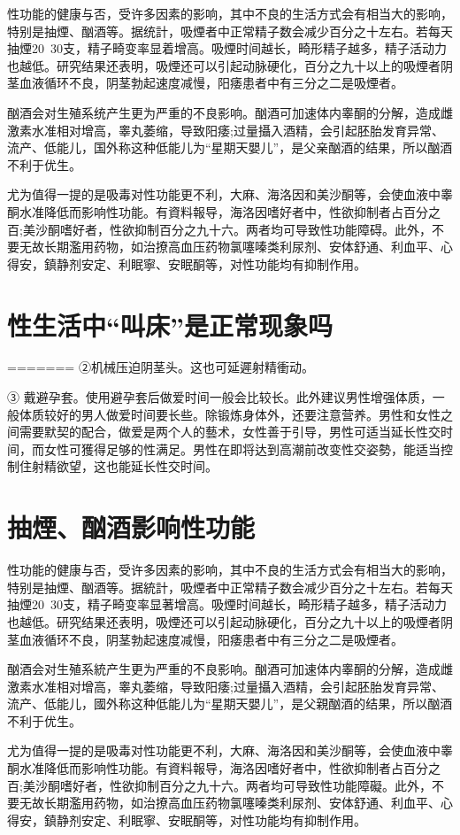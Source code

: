 \documentclass[12pt,UTF8]{ctexbook}
\begin{document}
性功能的健康与否，受许多因素的影响，其中不良的生活方式会有相当大的影响，特别是抽煙、酗酒等。据统計，吸煙者中正常精子数会减少百分之十左右。若每天抽煙20~30支，精子畸变率显着增高。吸煙时间越长，畸形精子越多，精子活动力也越低。研究结果还表明，吸煙还可以引起动脉硬化，百分之九十以上的吸煙者阴茎血液循环不良，阴茎勃起速度减慢，阳痿患者中有三分之二是吸煙者。

酗酒会对生殖系统产生更为严重的不良影响。酗酒可加速体内睾酮的分解，造成雌激素水准相对增高，睾丸萎缩，导致阳痿;过量攝入酒精，会引起胚胎发育异常、流产、低能儿，国外称这种低能儿为“星期天嬰儿”，是父亲酗酒的结果，所以酗酒不利于优生。

尤为值得一提的是吸毒对性功能更不利，大麻、海洛因和美沙酮等，会使血液中睾酮水准降低而影响性功能。有資料報导，海洛因嗜好者中，性欲抑制者占百分之百;美沙酮嗜好者，性欲抑制百分之九十六。两者均可导致性功能障碍。此外，不要无故长期濫用药物，如治撩高血压药物氯噻嗪类利尿剂、安体舒通、利血平、心得安，鎮静剂安定、利眠寧、安眠酮等，对性功能均有抑制作用。

\section{性生活中“叫床”是正常现象吗}
=======
②机械压迫阴茎头。这也可延遲射精衝动。

③ 戴避孕套。使用避孕套后做爱时间一般会比较长。此外建议男性增强体质，一般体质较好的男人做爱时间要长些。除锻炼身体外，还要注意营养。男性和女性之间需要默契的配合，做爱是两个人的藝术，女性善于引导，男性可适当延长性交时间，而女性可獲得足够的性满足。男性在即将达到高潮前改变性交姿勢，能适当控制住射精欲望，这也能延长性交时间。

\section{抽煙、酗酒影响性功能}

性功能的健康与否，受许多因素的影响，其中不良的生活方式会有相当大的影响，特别是抽煙、酗酒等。据統計，吸煙者中正常精子数会减少百分之十左右。若每天抽煙20~30支，精子畸变率显著增高。吸煙时间越长，畸形精子越多，精子活动力也越低。研究结果还表明，吸煙还可以引起动脉硬化，百分之九十以上的吸煙者阴茎血液循环不良，阴茎勃起速度减慢，阳痿患者中有三分之二是吸煙者。

酗酒会对生殖系統产生更为严重的不良影响。酗酒可加速体内睾酮的分解，造成雌激素水准相对增高，睾丸萎缩，导致阳痿;过量攝入酒精，会引起胚胎发育异常、流产、低能儿，國外称这种低能儿为“星期天嬰儿”，是父親酗酒的结果，所以酗酒不利于优生。

尤为值得一提的是吸毒对性功能更不利，大麻、海洛因和美沙酮等，会使血液中睾酮水准降低而影响性功能。有資料報导，海洛因嗜好者中，性欲抑制者占百分之百;美沙酮嗜好者，性欲抑制百分之九十六。两者均可导致性功能障礙。此外，不要无故长期濫用药物，如治撩高血压药物氯噻嗪类利尿剂、安体舒通、利血平、心得安，鎮静剂安定、利眠寧、安眠酮等，对性功能均有抑制作用。
\end{document}
